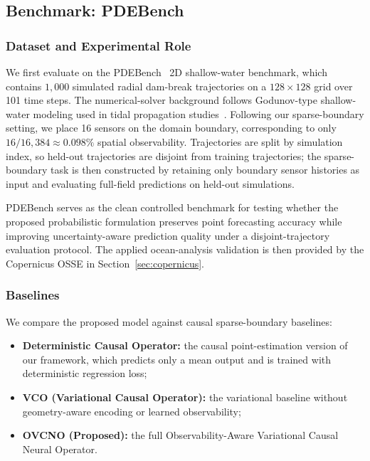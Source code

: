 \documentclass[11pt,a4paper]{article}
\begin{document}
\subsection{Benchmark: PDEBench}
\label{sec:pdebench}

\subsubsection{Dataset and Experimental Role}

We first evaluate on the PDEBench~\cite{takamoto2022pdebench} 2D shallow-water benchmark, which contains $1{,}000$ simulated radial dam-break trajectories on a $128 \times 128$ grid over 101 time steps. The numerical-solver background follows Godunov-type shallow-water modeling used in tidal propagation studies~\cite{nguyen2009godunov}. Following our sparse-boundary setting, we place 16 sensors on the domain boundary, corresponding to only $16 / 16{,}384 \approx 0.098\%$ spatial observability. Trajectories are split by simulation index, so held-out trajectories are disjoint from training trajectories; the sparse-boundary task is then constructed by retaining only boundary sensor histories as input and evaluating full-field predictions on held-out simulations.

PDEBench serves as the clean controlled benchmark for testing whether the proposed probabilistic formulation preserves point forecasting accuracy while improving uncertainty-aware prediction quality under a disjoint-trajectory evaluation protocol. The applied ocean-analysis validation is then provided by the Copernicus OSSE in Section~\ref{sec:copernicus}.

\subsubsection{Baselines}

We compare the proposed model against causal sparse-boundary baselines:
\begin{itemize}
    \item \textbf{Deterministic Causal Operator:} the causal point-estimation version of our framework, which predicts only a mean output and is trained with deterministic regression loss;
    \item \textbf{VCO (Variational Causal Operator):} the variational baseline without geometry-aware encoding or learned observability;
    \item \textbf{OVCNO (Proposed):} the full Observability-Aware Variational Causal Neural Operator.
\end{itemize}
\end{document}
